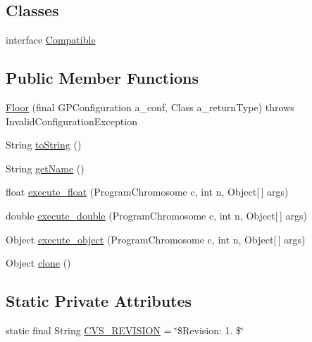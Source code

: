 \subsection*{Classes}
\begin{DoxyCompactItemize}
\item 
interface \hyperlink{interfaceorg_1_1jgap_1_1gp_1_1function_1_1_floor_1_1_compatible}{Compatible}
\end{DoxyCompactItemize}
\subsection*{Public Member Functions}
\begin{DoxyCompactItemize}
\item 
\hyperlink{classorg_1_1jgap_1_1gp_1_1function_1_1_floor_a29c4b19c67d1d793d199b15e5e328b8f}{Floor} (final G\-P\-Configuration a\-\_\-conf, Class a\-\_\-return\-Type)  throws Invalid\-Configuration\-Exception 
\item 
String \hyperlink{classorg_1_1jgap_1_1gp_1_1function_1_1_floor_ada06132e6b1390c65c8a066502921da8}{to\-String} ()
\item 
String \hyperlink{classorg_1_1jgap_1_1gp_1_1function_1_1_floor_af5b5561dd1bf6649d0ede30e72ff3411}{get\-Name} ()
\item 
float \hyperlink{classorg_1_1jgap_1_1gp_1_1function_1_1_floor_a0be7b5d383a058a505cd2be37e0bf603}{execute\-\_\-float} (Program\-Chromosome c, int n, Object\mbox{[}$\,$\mbox{]} args)
\item 
double \hyperlink{classorg_1_1jgap_1_1gp_1_1function_1_1_floor_a5c8290914e39a8f8b81c22bea5b92a9d}{execute\-\_\-double} (Program\-Chromosome c, int n, Object\mbox{[}$\,$\mbox{]} args)
\item 
Object \hyperlink{classorg_1_1jgap_1_1gp_1_1function_1_1_floor_a920c14ea1bb76a064c8469a473f284a7}{execute\-\_\-object} (Program\-Chromosome c, int n, Object\mbox{[}$\,$\mbox{]} args)
\item 
Object \hyperlink{classorg_1_1jgap_1_1gp_1_1function_1_1_floor_acf005673eb57354849c2b1cf32875abe}{clone} ()
\end{DoxyCompactItemize}
\subsection*{Static Private Attributes}
\begin{DoxyCompactItemize}
\item 
static final String \hyperlink{classorg_1_1jgap_1_1gp_1_1function_1_1_floor_a2f5f512703c704b9fbd13ca75d0d72d9}{C\-V\-S\-\_\-\-R\-E\-V\-I\-S\-I\-O\-N} = \char`\"{}\$Revision\-: 1. \$\char`\"{}
\end{DoxyCompactItemize}
